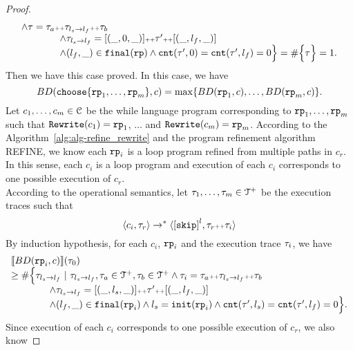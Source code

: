 \begin{proof}
\[\begin{array}{l}
    \land \mathtt{\tau} = \mathtt{\tau}_a {\scriptscriptstyle ++} \mathtt{\tau}_{l_s \to l_f} {\scriptscriptstyle ++} \mathtt{\tau}_b
    \\ \qquad \qquad
    \land \mathtt{\tau}_{l_s \to l_f} = [(\_, 0, \_)] {\scriptscriptstyle ++} \mathtt{\tau}' {\scriptscriptstyle ++} [(\_, l_f, \_)]
    \\ \qquad \qquad
    \land (l_{f}, \_) \in \mathtt{final}(\mathtt{rp})
    \land \mathtt{cnt}(\mathtt{\tau}', 0) = \mathtt{cnt}(\mathtt{\tau}', l_f) = 0 
    \Big\}
     = \# \Big\{\mathtt{\tau} \Big\} = 1.
  \end{array}
\]
Then we have this case proved.
In this case, we have
\[
  BD(\rpchoose{\rprog_1, \ldots, \rprog_m}, c) = \max\left\{ BD(\rprog_1, c), \ldots, BD(\rprog_m, c) \right\}.
\]
Let $c_1, \ldots, c_m \in \mathcal{C}$ be the while language program corresponding to $\mathtt{rp}_1, \ldots, \mathtt{rp}_m$ such that $\mathtt{Rewrite}(c_1) = \mathtt{rp}_1$, $\ldots$ and  $\mathtt{Rewrite}(c_m) = \mathtt{rp}_m$.
According to the Algorithm~\ref{alg:alg-refine_rewrite} and the program refinement algorithm REFINE, we know each $\mathtt{rp}_i$ is a loop program refined from multiple paths in $c_r$.
\\
In this sense, each $c_i$ is a loop program and execution of each $c_i$ corresponds to one possible execution of $c_r$.
\\
According to the operational semantics, let $\mathtt{\tau}_1, \ldots, \mathtt{\tau}_m \in \mathcal{T}^{+}$ be the execution traces such that 
\[
  \config{c_i, \trace_r} \to^* 
  \config{\clabel{\eskip}^{l}, \trace_r \tracecat \trace_i}
\]
By induction hypothesis, for each $c_i$, $\mathtt{rp}_i$ and the execution trace $\mathtt{\tau}_i$, we have 
\[
  \begin{array}{l}
  \llbracket BD(\mathtt{rp}_i, c) \rrbracket(\mathtt{\tau}_0) 
  \\ \geq
  \# \Big\{\mathtt{\tau}_{l_s \to l_f} ~\vert~ \mathtt{\tau}_{l_s \to l_f}, \mathtt{\tau}_a \in \mathcal{T}^{+}, \mathtt{\tau}_b \in \mathcal{T}^{+}
  \land \mathtt{\tau}_i = \mathtt{\tau}_a {\scriptscriptstyle ++} \mathtt{\tau}_{l_s \to l_f} {\scriptscriptstyle ++} \mathtt{\tau}_b
  \\ \qquad \qquad
  \land \mathtt{\tau}_{l_s \to l_f} = [(\_, l_s, \_)] {\scriptscriptstyle ++} \mathtt{\tau}' {\scriptscriptstyle ++} [(\_, l_f, \_)]
  \\ \qquad \qquad
  \land (l_{f}, \_) \in \mathtt{final}(\mathtt{rp}_i)
  \land l_s = \mathtt{init}(\mathtt{rp}_i)
  \land \mathtt{cnt}(\mathtt{\tau}', l_s) = \mathtt{cnt}(\mathtt{\tau}', l_f) = 0 
  \Big\}.
  \end{array}
\]
Since execution of each $c_i$ corresponds to one possible execution of $c_r$, we also know

\end{proof}

